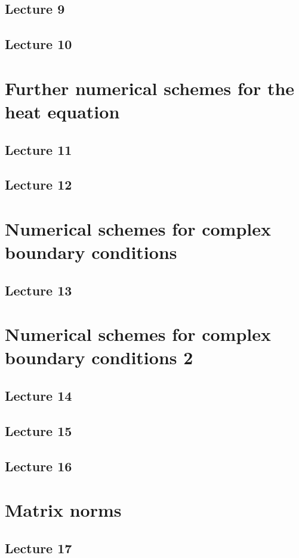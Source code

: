\documentclass{article}
\begin{document}
\subsection{Lecture 9}
\subsection{Lecture 10}


\section{Further numerical schemes for the heat equation}
\subsection{Lecture 11}
\subsection{Lecture 12}


\section{Numerical schemes for complex boundary conditions}
\subsection{Lecture 13}


\section{Numerical schemes for complex boundary conditions 2}
\subsection{Lecture 14}
\subsection{Lecture 15}
\subsection{Lecture 16}


\section{Matrix norms}
\subsection{Lecture 17}
\end{document}
